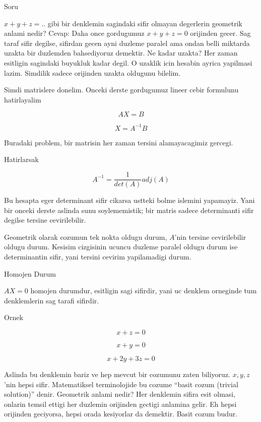\documentclass[12pt,fleqn]{article}
\begin{document}
Soru

$x + y + z = ..$ gibi bir denklemin sagindaki sifir olmayan degerlerin
geometrik anlami nedir? Cevap: Daha once gordugumuz $x + y + z = 0$
orijinden gecer. Sag taraf sifir degilse, sifirdan gecen ayni duzleme
paralel ama ondan belli miktarda uzakta bir duzlemden bahsediyoruz
demektir. Ne kadar uzakta? Her zaman esitligin sagindaki buyukluk kadar
degil. O uzaklik icin hesabin ayrica yapilmasi lazim. Simdilik sadece
orijinden uzakta oldugunu bilelim. 

Simdi matrislere donelim. Onceki derste gordugumuz lineer cebir formulunu
hatirlayalim

\[ AX = B \]

\[ X = A^{-1}B \]

Buradaki problem, bir matrisin her zaman tersini alamayacagimiz gercegi. 

Hatirlarsak 

\[ A^{-1} = \frac{1}{det(A)}adj(A) \]

Bu hesapta eger determinant sifir cikarsa ustteki bolme islemini
yapamayiz. Yani bir onceki derste aslinda sunu soylememistik; bir matris
sadece determinanti sifir degilse tersine cevirilebilir. 

Geometrik olarak cozumun tek nokta oldugu durum, $A$'nin tersine
cevirilebilir oldugu durum. Kesisim cizgisinin ucuncu duzleme paralel
oldugu durum ise determinantin sifir, yani tersini cevirim yapilamadigi
durum. 

Homojen Durum

$AX = 0$ homojen durumdur, esitligin sagi sifirdir, yani uc denklem
orneginde tum denklemlerin sag tarafi sifirdir. 

Ornek

\[ x + z = 0 \]

\[ x + y = 0 \]

\[ x + 2y + 3z = 0 \]

Aslinda bu denklemin bariz ve hep mevcut bir cozumunu zaten
biliyoruz. $x,y,z$'nin hepsi sifir. Matematiksel terminolojide bu cozume
``basit cozum (trivial solution)'' denir. Geometrik anlami nedir? Her
denklemin sifira esit olmasi, onlarin temsil ettigi her duzlemin orijinden
gectigi anlamina gelir. Eh hepsi orijinden geciyorsa, hepsi orada
kesiyorlar da demektir. Basit cozum budur. 
\end{document}
